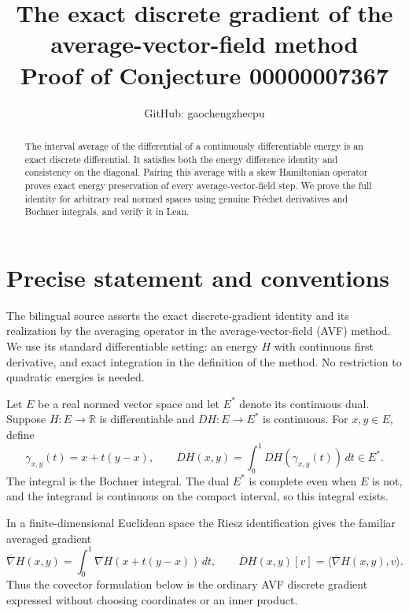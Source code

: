 \documentclass[10pt]{article}
\title{The exact discrete gradient of the average-vector-field method\\
\large Proof of Conjecture 00000007367}
\author{GitHub: gaochengzhecpu}\date{}
\begin{document}
\maketitle
\begin{abstract}
The interval average of the differential of a continuously differentiable
energy is an exact discrete differential. It satisfies both the energy
difference identity and consistency on the diagonal. Pairing this average
with a skew Hamiltonian operator proves exact energy preservation of
every average-vector-field step. We prove the full identity for arbitrary
real normed spaces using genuine Fr\'echet derivatives and Bochner
integrals, and verify it in Lean.
\end{abstract}

\section*{Precise statement and conventions}
The bilingual source asserts the exact discrete-gradient identity and
its realization by the averaging operator in the average-vector-field
(AVF) method. We use its standard differentiable setting: an energy
$H$ with continuous first derivative, and exact integration in the
definition of the method. No restriction to quadratic energies is needed.

Let $E$ be a real normed vector space and let $E^*$ denote its continuous
dual. Suppose $H:E\to\mathbb R$ is differentiable and
$DH:E\to E^*$ is continuous. For $x,y\in E$, define
\[
 \gamma_{x,y}(t)=x+t(y-x),\qquad
 \overline{D}H(x,y)=\int_0^1 DH(\gamma_{x,y}(t))\,dt\in E^*.
\]
The integral is the Bochner integral. The dual $E^*$ is complete even
when $E$ is not, and the integrand is continuous on the compact interval,
so this integral exists.

In a finite-dimensional Euclidean space the Riesz identification gives
the familiar averaged gradient
\[
 \overline\nabla H(x,y)=\int_0^1\nabla H(x+t(y-x))\,dt,
 \qquad
 \overline{D}H(x,y)[v]=\langle\overline\nabla H(x,y),v\rangle.
\]
Thus the covector formulation below is the ordinary AVF discrete
gradient expressed without choosing coordinates or an inner product.
\end{document}
